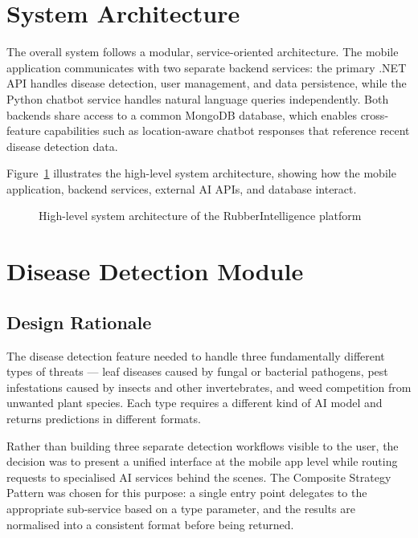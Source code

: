 \section{System Architecture}

The overall system follows a modular, service-oriented architecture. The mobile application communicates with two separate backend services: the primary .NET API handles disease detection, user management, and data persistence, while the Python chatbot service handles natural language queries independently. Both backends share access to a common MongoDB database, which enables cross-feature capabilities such as location-aware chatbot responses that reference recent disease detection data.

Figure~\ref{fig:system_arch} illustrates the high-level system architecture, showing how the mobile application, backend services, external AI APIs, and database interact.

\begin{figure}[H]
    \centering
    \caption{High-level system architecture of the RubberIntelligence platform}
    \label{fig:system_arch}
\end{figure}


\section{Disease Detection Module}

\subsection{Design Rationale}

The disease detection feature needed to handle three fundamentally different types of threats --- leaf diseases caused by fungal or bacterial pathogens, pest infestations caused by insects and other invertebrates, and weed competition from unwanted plant species. Each type requires a different kind of AI model and returns predictions in different formats.

Rather than building three separate detection workflows visible to the user, the decision was to present a unified interface at the mobile app level while routing requests to specialised AI services behind the scenes. The Composite Strategy Pattern was chosen for this purpose: a single entry point delegates to the appropriate sub-service based on a type parameter, and the results are normalised into a consistent format before being returned.

